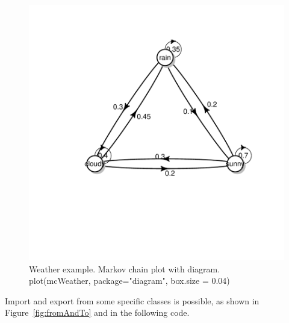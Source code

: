 \documentclass[nojss]{jss}
\begin{document}
\begin{figure}
\begin{center}
\includegraphics{an_introduction_to_markovchain_package-mcPlotdiagram}
\caption{Weather example. Markov chain plot with diagram. plot(mcWeather, package="diagram", box.size = 0.04)}
\label{fig:mcPlotdiagram}
\end{center}
\end{figure}


Import and export from some specific classes is possible, as shown in
Figure~\ref{fig:fromAndTo} and in the following code.\\
\end{document}
